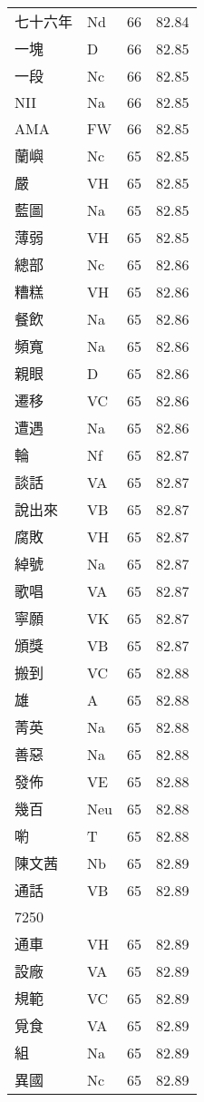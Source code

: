 \documentclass[twocolumn]{book}
\begin{document}
\begin{supertabular}{llrr}
七十六年 & Nd & 66 &  82.84\\
一塊 & D & 66 &  82.85\\
一段 & Nc & 66 &  82.85\\
NII & Na & 66 &  82.85\\
AMA & FW & 66 &  82.85\\
蘭嶼 & Nc & 65 &  82.85\\
嚴 & VH & 65 &  82.85\\
藍圖 & Na & 65 &  82.85\\
薄弱 & VH & 65 &  82.85\\
總部 & Nc & 65 &  82.86\\
糟糕 & VH & 65 &  82.86\\
餐飲 & Na & 65 &  82.86\\
頻寬 & Na & 65 &  82.86\\
親眼 & D & 65 &  82.86\\
遷移 & VC & 65 &  82.86\\
遭遇 & Na & 65 &  82.86\\
輪 & Nf & 65 &  82.87\\
談話 & VA & 65 &  82.87\\
說出來 & VB & 65 &  82.87\\
腐敗 & VH & 65 &  82.87\\
綽號 & Na & 65 &  82.87\\
歌唱 & VA & 65 &  82.87\\
寧願 & VK & 65 &  82.87\\
頒獎 & VB & 65 &  82.87\\
搬到 & VC & 65 &  82.88\\
雄 & A & 65 &  82.88\\
菁英 & Na & 65 &  82.88\\
善惡 & Na & 65 &  82.88\\
發佈 & VE & 65 &  82.88\\
幾百 & Neu & 65 &  82.88\\
喲 & T & 65 &  82.88\\
陳文茜 & Nb & 65 &  82.89\\
通話 & VB & 65 &  82.89\\
7250\\
通車 & VH & 65 &  82.89\\
設廠 & VA & 65 &  82.89\\
規範 & VC & 65 &  82.89\\
覓食 & VA & 65 &  82.89\\
組 & Na & 65 &  82.89\\
異國 & Nc & 65 &  82.89\\

\end{supertabular}
\end{document}
